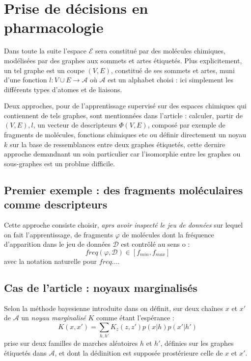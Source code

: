 \newpage
\section{Prise de d\'ecisions en pharmacologie}

Dans toute la suite l'espace $\mathcal{E}$ sera constitu\'e par des mol\'ecules chimiques, mod\'elis\'ees par des graphes aux sommets et artes \'etiquet\'es. %
Plus explicitement, un tel graphe est un coupe $(V,E)$, constitu\'e de ses sommets et artes, muni d'une fonction $l: V \cup E \rightarrow \mathcal{A}$ o\`u $\mathcal{A}$ est un alphabet choisi : %
ici simplement les diff\'erents types d'atomes et de liaisons.

\par
Deux approches, pour de l'apprentissage supervis\'e sur des espaces chimiques qui contiennent de tels graphes, sont mentionn\'ees dans l'article : %
calculer,  partir de $(V,E),l$, un vecteur de descripteurs $\Phi (V,E)$, compos\'e par exemple de fragments de mol\'ecules, fonctions chimiques etc %
ou d\'efinir directement un noyau $k$ sur la base de \og{} ressemblances\fg{} entre deux graphes \'etiquet\'es, %
cette dernire approche demandnant un soin particulier car l'isomorphie entre les graphes ou sous-graphes est un problme difficile.

\subsection{Premier exemple \cite{He} : des fragments mol\'eculaires comme descripteurs}

Cette approche consiste  choisir, \emph{aprs avoir inspect\'e le jeu de donn\'ees} sur lequel on fait l'apprentissage, %
de fragments $\varphi$ de mol\'ecules dont la fr\'equence d'apparition dans le jeu de donn\'ees $\mathcal{D}$ est contr\^ol\'e au sens o :
\[freq(\varphi,\mathcal{D})\in [f_{min},f_{max}]\]
avec la notation naturelle pour $freq \dots$.

\subsection{Cas de l'article \cite{Mahe} : noyaux marginalis\'es}

Selon la m\'ethode bayesienne introduite dans \cite{Ka} on d\'efinit, sur deux cha\^ines $x$ et $x'$ de $\mathcal{A}$ un \emph{noyau marginalis\'e} $K$ comme \'etant l'esp\'erance :
\[K(x,x')=\sum\limits_{h,h'}K_z(z,z')p(x|h)p(x'|h')\]
prise sur deux familles de marches al\'eatoires $h$ et $h'$, d\'efinies sur les graphes \'etiquet\'es dans $\mathcal{A}$, et dont la d\'edinition est suppos\'ee prost\'erieure  celle de $x$ et $x'$.

